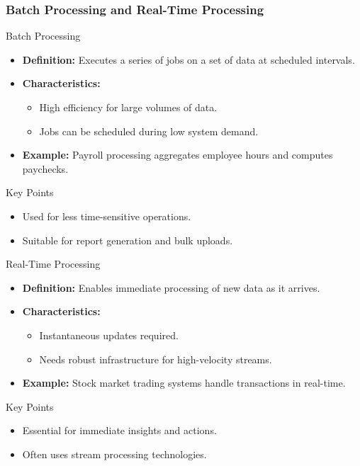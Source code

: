 \documentclass[aspectratio=169]{beamer}
\begin{document}
\begin{frame}[fragile]
    \frametitle{Batch Processing and Real-Time Processing}
    \begin{block}{Batch Processing}
        \begin{itemize}
            \item \textbf{Definition:} Executes a series of jobs on a set of data at scheduled intervals.
            \item \textbf{Characteristics:}
            \begin{itemize}
                \item High efficiency for large volumes of data.
                \item Jobs can be scheduled during low system demand.
            \end{itemize}
            \item \textbf{Example:} Payroll processing aggregates employee hours and computes paychecks.
        \end{itemize}
        \begin{block}{Key Points}
            \begin{itemize}
                \item Used for less time-sensitive operations.
                \item Suitable for report generation and bulk uploads.
            \end{itemize}
        \end{block}
    \end{block}

    \begin{block}{Real-Time Processing}
        \begin{itemize}
            \item \textbf{Definition:} Enables immediate processing of new data as it arrives.
            \item \textbf{Characteristics:}
            \begin{itemize}
                \item Instantaneous updates required.
                \item Needs robust infrastructure for high-velocity streams.
            \end{itemize}
            \item \textbf{Example:} Stock market trading systems handle transactions in real-time.
        \end{itemize}
        \begin{block}{Key Points}
            \begin{itemize}
                \item Essential for immediate insights and actions.
                \item Often uses stream processing technologies.
            \end{itemize}
        \end{block}
    \end{block}
\end{frame}
\end{document}

